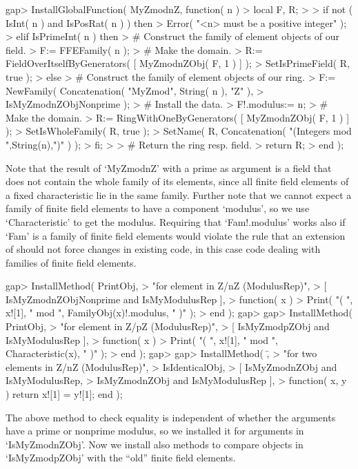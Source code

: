 \beginexample
gap> InstallGlobalFunction( MyZmodnZ, function( n )
>    local F, R;
> 
>    if not ( IsInt( n ) and IsPosRat( n ) ) then
>      Error( "<n> must be a positive integer" );
>    elif IsPrimeInt( n ) then
>      # Construct the family of element objects of our field.
>      F:= FFEFamily( n );
>      # Make the domain.
>      R:= FieldOverItselfByGenerators( [ MyZmodnZObj( F, 1 ) ] );
>      SetIsPrimeField( R, true );
>    else
>      # Construct the family of element objects of our ring.
>      F:= NewFamily( Concatenation( "MyZmod", String( n ), "Z" ),
>                     IsMyZmodnZObjNonprime );
>      # Install the data.
>      F!.modulus:= n;
>      # Make the domain.
>      R:= RingWithOneByGenerators( [ MyZmodnZObj( F, 1 ) ] );
>      SetIsWholeFamily( R, true );
>      SetName( R, Concatenation( "(Integers mod ",String(n),")" ) );
>    fi;
> 
>    # Return the ring resp. field.
>    return R;
> end );
\endexample

Note that the result of `MyZmodnZ' with a prime as argument is a field that
does not contain the whole family of its elements, since all finite field
elements of a fixed characteristic lie in the same family.
Further note that we cannot expect a family of finite field elements
to have a component `modulus',
so we use `Characteristic' to get the modulus.
Requiring that `Fam!.modulus' works also if `Fam' is a family of
finite field elements would violate the rule
that an extension of {\GAP} should not force changes in existing code,
in this case code dealing with families of finite field elements.

\beginexample
gap> InstallMethod( PrintObj,
>    "for element in Z/nZ (ModulusRep)",
>    [ IsMyZmodnZObjNonprime and IsMyModulusRep ],
>    function( x )
>    Print( "( ", x![1], " mod ", FamilyObj(x)!.modulus, " )" );
>    end );
gap> 
gap> InstallMethod( PrintObj,
>    "for element in Z/pZ (ModulusRep)",
>    [ IsMyZmodpZObj and IsMyModulusRep ],
>    function( x )
>    Print( "( ", x![1], " mod ", Characteristic(x), " )" );
>    end );
gap> 
gap> InstallMethod( \=,
>    "for two elements in Z/nZ (ModulusRep)",
>    IsIdenticalObj,
>    [ IsMyZmodnZObj and IsMyModulusRep,
>      IsMyZmodnZObj and IsMyModulusRep ],
>    function( x, y ) return x![1] = y![1]; end );
\endexample

The above method to check equality is independent of whether the
arguments have a prime or nonprime modulus,
so we installed it for arguments in `IsMyZmodnZObj'.
Now we install also methods to compare objects in `IsMyZmodpZObj'
with the ``old'' finite field elements.


